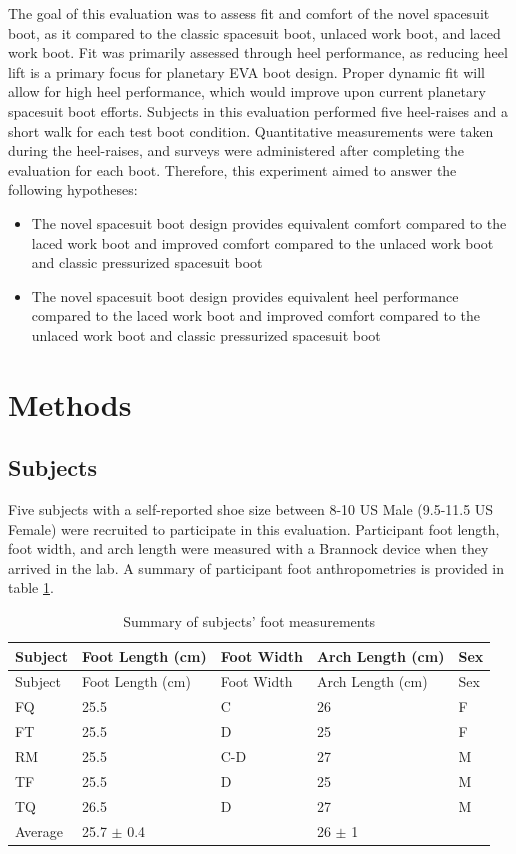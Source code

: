 \documentclass[defaultstyle,11pt]{thesis}
\providecommand{\tightlist}{%
  \setlength{\itemsep}{0pt}\setlength{\parskip}{0pt}}
\begin{document}
The goal of this evaluation was to assess fit and comfort of the novel spacesuit boot, as it compared to the classic spacesuit boot, unlaced work boot, and laced work boot.
Fit was primarily assessed through heel performance, as reducing heel lift is a primary focus for planetary EVA boot design.
Proper dynamic fit will allow for high heel performance, which would improve upon current planetary spacesuit boot efforts.
Subjects in this evaluation performed five heel-raises and a short walk for each test boot condition.
Quantitative measurements were taken during the heel-raises, and surveys were administered after completing the evaluation for each boot.
Therefore, this experiment aimed to answer the following hypotheses:

\begin{itemize}
\tightlist
\item
  The novel spacesuit boot design provides equivalent comfort compared to the laced work boot and improved comfort compared to the unlaced work boot and classic pressurized spacesuit boot
\item
  The novel spacesuit boot design provides equivalent heel performance compared to the laced work boot and improved comfort compared to the unlaced work boot and classic pressurized spacesuit boot
\end{itemize}

\hypertarget{methods-3}{%
\section{Methods}\label{methods-3}}

\hypertarget{subjects-1}{%
\subsection{Subjects}\label{subjects-1}}

Five subjects with a self-reported shoe size between 8-10 US Male (9.5-11.5 US Female) were recruited to participate in this evaluation.
Participant foot length, foot width, and arch length were measured with a Brannock device when they arrived in the lab.
A summary of participant foot anthropometries is provided in table \ref{tbl:foot_meas}.

\hypertarget{tbl:foot_meas}{}
\begin{longtable}[]{@{}lllll@{}}
\caption{\label{tbl:foot_meas}Summary of subjects' foot measurements}\tabularnewline
\toprule
Subject & Foot Length (cm) & Foot Width & Arch Length (cm) & Sex \\
\midrule
\endfirsthead
\toprule
Subject & Foot Length (cm) & Foot Width & Arch Length (cm) & Sex \\
\midrule
\endhead
FQ & 25.5 & C & 26 & F \\
FT & 25.5 & D & 25 & F \\
RM & 25.5 & C-D & 27 & M \\
TF & 25.5 & D & 25 & M \\
TQ & 26.5 & D & 27 & M \\
Average & 25.7 \(\pm\) 0.4 & & 26 \(\pm\) 1 & \\
\bottomrule
\end{longtable}
\end{document}
